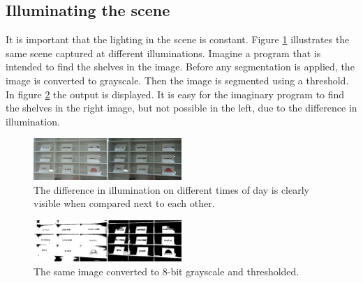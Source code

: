 




\subsection{Illuminating the scene}

It is important that the lighting in the scene is constant. Figure \ref{fig:scene_light} illustrates the same scene captured at different illuminations. Imagine a program that is intended to find the shelves in the image. Before any segmentation is applied, the image is converted to grayscale. Then the image is segmented using a threshold. In figure \ref{fig:scene_thresholded} the output is displayed. It is easy for the imaginary program to find the shelves in the right image, but not possible in the left, due to the difference in illumination.  

\begin{figure}[htbp] 
\centering 
\includegraphics[width=0.5\textwidth]{Pictures/HjoerringLibrary/scene_lighting.png} 
\caption{The difference in illumination on different times of day is clearly visible when compared next to each other.} 
\label{fig:scene_light} 
\end{figure}

\begin{figure}[htbp] 
\centering 
\includegraphics[width=0.5\textwidth]{Pictures/HjoerringLibrary/scene_lighting_thresholded.png} 
\caption{The same image converted to 8-bit grayscale and thresholded.} 
\label{fig:scene_thresholded} 
\end{figure}

